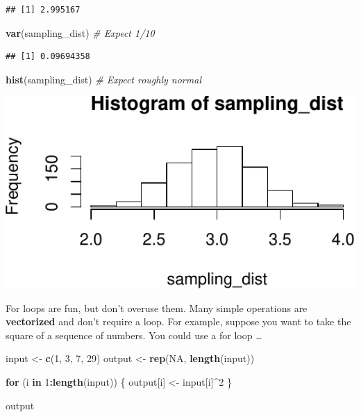 \documentclass[
  12pt,
  oneside,openany]{book}
\newenvironment{Shaded}{\begin{snugshade}}{\end{snugshade}}
\newcommand{\CommentTok}[1]{\textcolor[rgb]{0.56,0.35,0.01}{\textit{#1}}}
\newcommand{\ControlFlowTok}[1]{\textcolor[rgb]{0.13,0.29,0.53}{\textbf{#1}}}
\newcommand{\DecValTok}[1]{\textcolor[rgb]{0.00,0.00,0.81}{#1}}
\newcommand{\KeywordTok}[1]{\textcolor[rgb]{0.13,0.29,0.53}{\textbf{#1}}}
\newcommand{\NormalTok}[1]{#1}
\newcommand{\OperatorTok}[1]{\textcolor[rgb]{0.81,0.36,0.00}{\textbf{#1}}}
\newcommand{\OtherTok}[1]{\textcolor[rgb]{0.56,0.35,0.01}{#1}}
\newcommand{\StringTok}[1]{\textcolor[rgb]{0.31,0.60,0.02}{#1}}
\begin{document}
\begin{verbatim}
## [1] 2.995167
\end{verbatim}

\begin{Shaded}
\begin{Highlighting}[]
\KeywordTok{var}\NormalTok{(sampling\_dist)  }\CommentTok{\# Expect 1/10}
\end{Highlighting}
\end{Shaded}

\begin{verbatim}
## [1] 0.09694358
\end{verbatim}

\begin{Shaded}
\begin{Highlighting}[]
\KeywordTok{hist}\NormalTok{(sampling\_dist)  }\CommentTok{\# Expect roughly normal}
\end{Highlighting}
\end{Shaded}

\includegraphics{pdaps_files/figure-latex/sampling-dist-results-1.pdf}

For loops are fun, but don't overuse them. Many simple operations are \textbf{vectorized} and don't require a loop. For example, suppose you want to take the square of a sequence of numbers. You could use a for loop \ldots{}

\begin{Shaded}
\begin{Highlighting}[]
\NormalTok{input <{-}}\StringTok{ }\KeywordTok{c}\NormalTok{(}\DecValTok{1}\NormalTok{, }\DecValTok{3}\NormalTok{, }\DecValTok{7}\NormalTok{, }\DecValTok{29}\NormalTok{)}
\NormalTok{output <{-}}\StringTok{ }\KeywordTok{rep}\NormalTok{(}\OtherTok{NA}\NormalTok{, }\KeywordTok{length}\NormalTok{(input))}

\ControlFlowTok{for}\NormalTok{ (i }\ControlFlowTok{in} \DecValTok{1}\OperatorTok{:}\KeywordTok{length}\NormalTok{(input)) \{}
\NormalTok{  output[i] <{-}}\StringTok{ }\NormalTok{input[i]}\OperatorTok{\^{}}\DecValTok{2}
\NormalTok{\}}

\NormalTok{output}
\end{Highlighting}
\end{Shaded}
\end{document}

